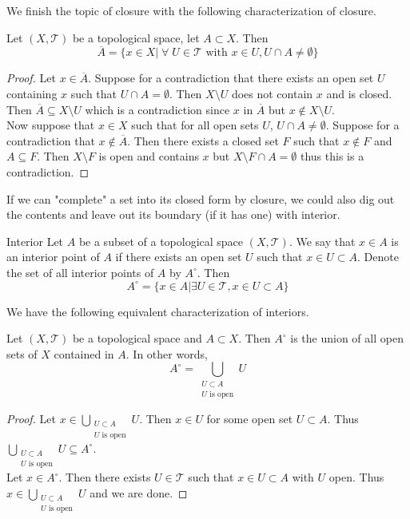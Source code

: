 \documentclass[a4paper]{article}
\begin{document}
We finish the topic of closure with the following characterization of closure. 

\begin{thm}{}{} Let $(X,\mathcal{T})$ be a topological space, let $A\subset X$. Then $$\overline{A}=\{x\in X|\;\forall\;U\in\mathcal{T}\text{ with }x\in U,U\cap A\neq\emptyset\}$$ 
\begin{proof}
Let $x\in\overline{A}$. Suppose for a contradiction that there exists an open set $U$ containing $x$ such that $U\cap A=\emptyset$. Then $X\setminus U$ does not contain $x$ and is closed. Then $\overline{A}\subseteq X\setminus U$ which is a contradiction since $x$ in $\overline{A}$ but $x\notin X\setminus U$. \\
Now suppose that $x\in X$ such that for all open sets $U$, $U\cap A\neq\emptyset$. Suppose for a contradiction that $x\notin\overline{A}$. Then there exists a closed set $F$ such that $x\notin F$ and $A\subseteq F$. Then $X\setminus F$ is open and contains $x$ but $X\setminus F\cap A=\emptyset$ thus this is a contradiction. 
\end{proof}
\end{thm}

If we can "complete" a set into its closed form by closure, we could also dig out the contents and leave out its boundary (if it has one) with interior. 

\begin{defn}{Interior}{} Let $A$ be a subset of a topological space $(X,\mathcal{T})$. We say that $x\in A$ is an interior point of $A$ if there exists an open set $U$ such that $x\in U\subset A$. Denote the set of all interior points of $A$ by $A^\circ$. Then $$A^\circ=\{x\in A|\exists U\in\mathcal{T},x\in U\subset A\}$$
\end{defn}

We have the following equivalent characterization of interiors. 

\begin{prp}{}{} Let $(X,\mathcal{T})$ be a topological space and $A\subset X$. Then $A^\circ$ is the union of all open sets of $X$ contained in $A$. In other words, $$A^\circ=\bigcup_{\substack{U\subset A\\U\text{ is open}}}U$$
\begin{proof}
Let $x\in\bigcup_{\substack{U\subset A\\U\text{ is open}}}U$. Then $x\in U$ for some open set $U\subset A$. Thus $\bigcup_{\substack{U\subset A\\U\text{ is open}}}U\subseteq A^\circ$. \\
Let $x\in A^\circ$. Then there exists $U\in\mathcal{T}$ such that $x\in U\subset A$ with $U$ open. Thus $x\in\bigcup_{\substack{U\subset A\\U\text{ is open}}}U$ and we are done. 
\end{proof}
\end{prp}
\end{document}
